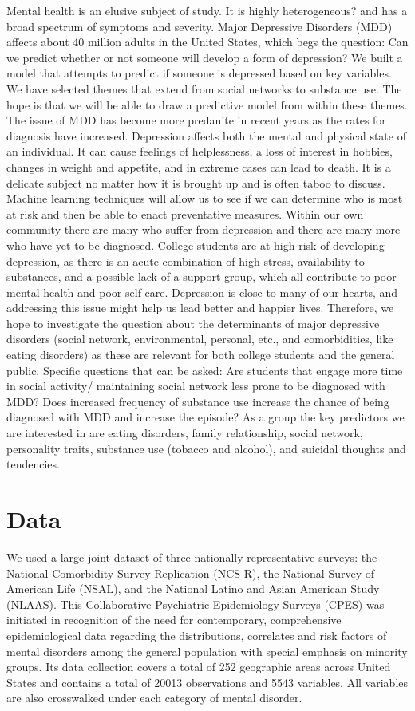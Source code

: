 \documentclass[]{article}
\begin{document}
Mental health is an elusive subject of study. It is highly
heterogeneous? and has a broad spectrum of symptoms and severity. Major
Depressive Disorders (MDD) affects about 40 million adults in the United
States, which begs the question: Can we predict whether or not someone
will develop a form of depression? We built a model that attempts to
predict if someone is depressed based on key variables. We have selected
themes that extend from social networks to substance use. The hope is
that we will be able to draw a predictive model from within these
themes. The issue of MDD has become more predanite in recent years as
the rates for diagnosis have increased. Depression affects both the
mental and physical state of an individual. It can cause feelings of
helplessness, a loss of interest in hobbies, changes in weight and
appetite, and in extreme cases can lead to death. It is a delicate
subject no matter how it is brought up and is often taboo to discuss.
Machine learning techniques will allow us to see if we can determine who
is most at risk and then be able to enact preventative measures. Within
our own community there are many who suffer from depression and there
are many more who have yet to be diagnosed. College students are at high
risk of developing depression, as there is an acute combination of high
stress, availability to substances, and a possible lack of a support
group, which all contribute to poor mental health and poor self-care.
Depression is close to many of our hearts, and addressing this issue
might help us lead better and happier lives. Therefore, we hope to
investigate the question about the determinants of major depressive
disorders (social network, environmental, personal, etc., and
comorbidities, like eating disorders) as these are relevant for both
college students and the general public. Specific questions that can be
asked: Are students that engage more time in social activity/
maintaining social network less prone to be diagnosed with MDD? Does
increased frequency of substance use increase the chance of being
diagnosed with MDD and increase the episode? As a group the key
predictors we are interested in are eating disorders, family
relationship, social network, personality traits, substance use (tobacco
and alcohol), and suicidal thoughts and tendencies.

\section{Data}\label{data}

We used a large joint dataset of three nationally representative
surveys: the National Comorbidity Survey Replication (NCS-R), the
National Survey of American Life (NSAL), and the National Latino and
Asian American Study (NLAAS). This Collaborative Psychiatric
Epidemiology Surveys (CPES) was initiated in recognition of the need for
contemporary, comprehensive epidemiological data regarding the
distributions, correlates and risk factors of mental disorders among the
general population with special emphasis on minority groups. Its data
collection covers a total of 252 geographic areas across United States
and contains a total of 20013 observations and 5543 variables. All
variables are also crosswalked under each category of mental disorder.
\end{document}
